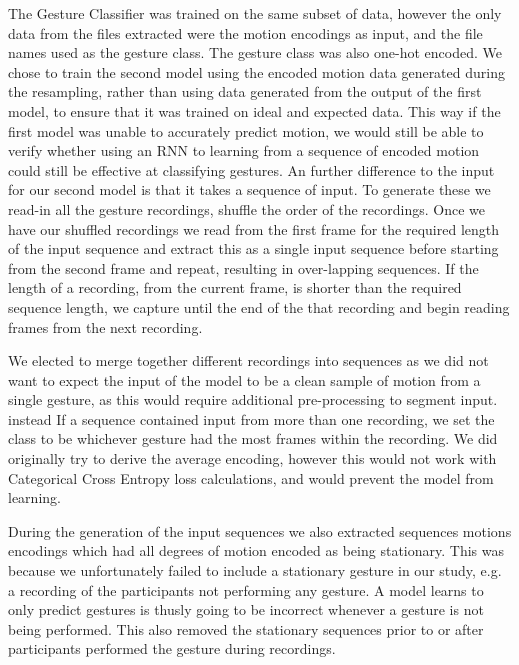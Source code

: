 The Gesture Classifier was trained on the same subset of data, however the only data from the files extracted were the motion encodings as input, and the file names used as the gesture class. The gesture class was also one-hot encoded.
We chose to train the second model using the encoded motion data generated during the resampling, rather than using data generated from the output of the first model, to ensure that it was trained on ideal and expected data. This way if the first model was unable to accurately predict motion, we would still be able to verify whether using an RNN to learning from a sequence of encoded motion could still be effective at classifying gestures.
An further difference to the input for our second model is that it takes a sequence of input. To generate these we read-in all the gesture recordings, shuffle the order of the recordings. Once we have our shuffled recordings we read from the first frame for the required length of the input sequence and extract this as a single input sequence before starting from the second frame and repeat, resulting in over-lapping sequences. If the length of a recording, from the current frame, is shorter than the required sequence length, we capture until the end of the that recording and begin reading frames from the next recording. 

We elected to merge together different recordings into sequences as we did not want to expect the input of the model to be a clean sample of motion from a single gesture, as this would require additional pre-processing to segment input. instead
If a sequence contained input from more than one recording, we set the class to be whichever gesture had the most frames within the recording. We did originally try to derive the average encoding, however this would not work with Categorical Cross Entropy loss calculations, and would prevent the model from learning.

During the generation of the input sequences we also extracted sequences motions encodings which had all degrees of motion encoded as being stationary. This was because we unfortunately failed to include a stationary gesture in our study, e.g. a recording of the participants not performing any gesture. A model learns to only predict gestures is thusly going to be incorrect whenever a gesture is not being performed. This also removed the stationary sequences prior to or after participants performed the gesture during recordings.




